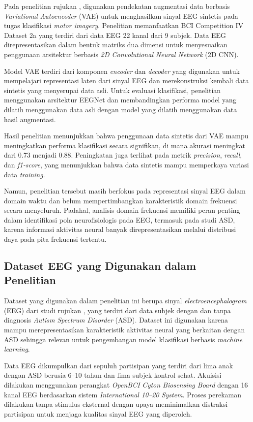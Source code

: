 Pada penelitian rujukan \cite{gan_eeg_emotion}, digunakan pendekatan augmentasi data berbasis \textit{Variational Autoencoder} (VAE) untuk menghasilkan sinyal EEG sintetis pada tugas klasifikasi \textit{motor imagery}. Penelitian memanfaatkan BCI Competition IV Dataset 2a yang terdiri dari data EEG 22 kanal dari 9 subjek. Data EEG direpresentasikan dalam bentuk matriks dua dimensi untuk menyesuaikan penggunaan arsitektur berbasis \textit{2D Convolutional Neural Network} (2D CNN).

Model VAE terdiri dari komponen \textit{encoder} dan \textit{decoder} yang digunakan untuk mempelajari representasi laten dari sinyal EEG dan merekonstruksi kembali data sintetis yang menyerupai data asli. Untuk evaluasi klasifikasi, penelitian menggunakan arsitektur EEGNet dan membandingkan performa model yang dilatih menggunakan data asli dengan model yang dilatih menggunakan data hasil augmentasi.

Hasil penelitian menunjukkan bahwa penggunaan data sintetis dari VAE mampu meningkatkan performa klasifikasi secara signifikan, di mana akurasi meningkat dari 0.73 menjadi 0.88. Peningkatan juga terlihat pada metrik \textit{precision}, \textit{recall}, dan \textit{f1-score}, yang menunjukkan bahwa data sintetis mampu memperkaya variasi data \textit{training}.

Namun, penelitian tersebut masih berfokus pada representasi sinyal EEG dalam domain waktu dan belum mempertimbangkan karakteristik domain frekuensi secara menyeluruh. Padahal, analisis domain frekuensi memiliki peran penting dalam identifikasi pola neurofisiologis pada EEG, termasuk pada studi ASD, karena informasi aktivitas neural banyak direpresentasikan melalui distribusi daya pada pita frekuensi tertentu.

\subsection{Dataset EEG yang Digunakan dalam Penelitian}
\label{Dataset EEG yang Digunakan}

Dataset yang digunakan dalam penelitian ini berupa sinyal \textit{electroencephalogram} (EEG) dari studi rujukan \cite{eeg_dataset_asd}, yang terdiri dari data subjek dengan dan tanpa diagnosis \textit{Autism Spectrum Disorder} (ASD). Dataset ini digunakan karena mampu merepresentasikan karakteristik aktivitas neural yang berkaitan dengan ASD sehingga relevan untuk pengembangan model klasifikasi berbasis \textit{machine learning}.

Data EEG dikumpulkan dari sepuluh partisipan yang terdiri dari lima anak dengan ASD berusia 6--10 tahun dan lima subjek kontrol sehat. Akuisisi dilakukan menggunakan perangkat \textit{OpenBCI Cyton Biosensing Board} dengan 16 kanal EEG berdasarkan sistem \textit{International 10--20 System}. Proses perekaman dilakukan tanpa stimulus eksternal dengan upaya meminimalkan distraksi partisipan untuk menjaga kualitas sinyal EEG yang diperoleh.

